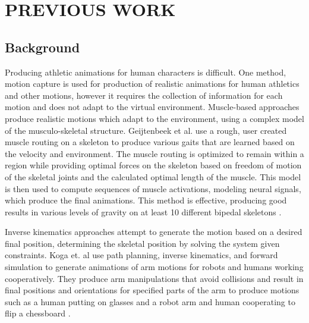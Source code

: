 
 
\chapter{PREVIOUS WORK}
\label{chapter:previous_work}

\section{Background}
Producing athletic animations for human characters is difficult.  One method, motion capture is used for production of realistic animations for human athletics and other motions, however it requires the collection of information for each motion and does not adapt to the virtual environment.  Muscle-based approaches produce realistic motions which adapt to the environment, using a complex model of the musculo-skeletal structure.  Geijtenbeek et al. use a rough, user created muscle routing on a skeleton to produce various gaits that are learned based on the velocity and environment.  The muscle routing is optimized to remain within a region while providing optimal forces on the skeleton based on freedom of motion of the skeletal joints and the calculated optimal length of the muscle.  This model is then used to compute sequences of muscle activations, modeling neural signals, which produce the final animations.  This method is effective, producing good results in various levels of gravity on at least 10 different bipedal skeletons \cite{muscle_based_bipeds}.

		
Inverse kinematics approaches attempt to generate the motion based on a desired final position, determining the skeletal position by solving the system given constraints.  Koga et. al use path planning, inverse kinematics, and forward simulation to generate animations of arm motions for robots and humans working cooperatively.  They produce arm manipulations that avoid collisions and result in final positions and orientations for specified parts of the arm to produce motions such as a human putting on glasses and a robot arm and human cooperating to flip a chessboard \cite{motion_intentions}.  
		
